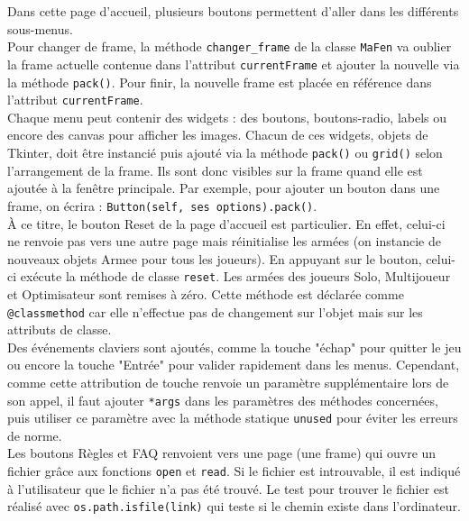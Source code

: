 \documentclass[a4paper]{article} %
\begin{document}
Dans cette page d'accueil, plusieurs boutons permettent d'aller dans les différents sous-menus.
\\
Pour changer de frame, la méthode \texttt{changer\_frame} de la classe \texttt{MaFen} va oublier la frame actuelle contenue dans l'attribut \texttt{currentFrame} et ajouter la nouvelle via la méthode \texttt{pack()}. Pour finir, la nouvelle frame est placée en référence dans l'attribut \texttt{currentFrame}.\\

Chaque menu peut contenir des widgets : des boutons, boutons-radio, labels ou encore des canvas pour afficher les images. Chacun de ces widgets, objets de Tkinter, doit être instancié puis ajouté via la méthode \texttt{pack()} ou \texttt{grid()} selon l'arrangement de la frame. Ils sont donc visibles sur la frame quand elle est ajoutée à la fenêtre principale. Par exemple, pour ajouter un bouton dans une frame, on écrira : \texttt{Button(self, ses options).pack()}.\\

À ce titre, le bouton Reset de la page d'accueil est particulier. En effet, celui-ci ne renvoie pas vers une autre page mais réinitialise les armées (on instancie de nouveaux objets Armee pour tous les joueurs). En appuyant sur le bouton, celui-ci exécute la méthode de classe \texttt{reset}. Les armées des joueurs Solo, Multijoueur et Optimisateur sont remises à zéro. Cette méthode est déclarée comme \texttt{@classmethod} car elle n'effectue pas de changement sur l'objet mais sur les attributs de classe.\\

Des événements claviers sont ajoutés, comme la touche "échap" pour quitter le jeu ou encore la touche "Entrée" pour valider rapidement dans les menus. Cependant, comme cette attribution de touche renvoie un paramètre supplémentaire lors de son appel, il faut ajouter \texttt{*args} dans les paramètres des méthodes concernées, puis utiliser ce paramètre avec la méthode statique \texttt{unused} pour éviter les erreurs de norme.\\

Les boutons Règles et FAQ renvoient vers une page (une frame) qui ouvre un fichier grâce aux fonctions \texttt{open} et \texttt{read}. Si le fichier est introuvable, il est indiqué à l'utilisateur que le fichier n'a pas été trouvé. Le test pour trouver le fichier est réalisé avec \texttt{os.path.isfile(link)} qui teste si le chemin existe dans l'ordinateur.\\
\end{document}
